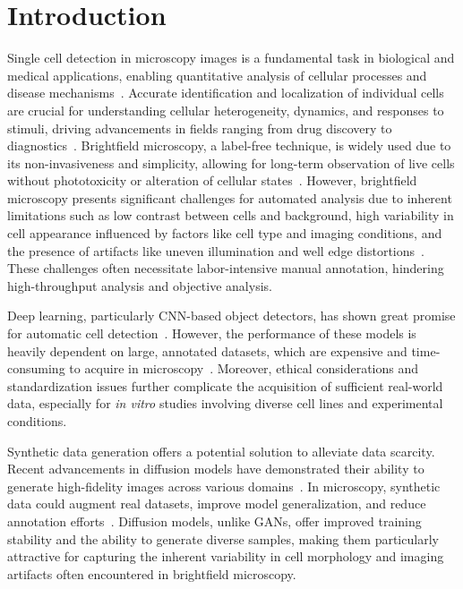 \section{Introduction}
\label{sec:introduction}
Single cell detection in microscopy images is a fundamental task in biological and medical applications, enabling quantitative analysis of cellular processes and disease mechanisms~\cite{meijering_cell_2012}.
Accurate identification and localization of individual cells are crucial for understanding cellular heterogeneity, dynamics, and responses to stimuli, driving advancements in fields ranging from drug discovery to diagnostics~\cite{f_mualla_automatic_2016,e_d_ferreira_classification_2024}.
Brightfield microscopy, a label-free technique, is widely used due to its non-invasiveness and simplicity, allowing for long-term observation of live cells without phototoxicity or alteration of cellular states~\cite{jyrki_selinummi_bright_2009,huixia_ren_cellbow_2020}.
However, brightfield microscopy presents significant challenges for automated analysis due to inherent limitations such as low contrast between cells and background, high variability in cell appearance influenced by factors like cell type and imaging conditions, and the presence of artifacts like uneven illumination and well edge distortions~\cite{jyrki_selinummi_bright_2009,f_mualla_automatic_2016}.
These challenges often necessitate labor-intensive manual annotation, hindering high-throughput analysis and objective analysis.

Deep learning, particularly CNN-based object detectors, has shown great promise for automatic cell detection~\cite{erick_moen_deep_2019,thorsten_falk_u-net_2019}.
However, the performance of these models is heavily dependent on large, annotated datasets, which are expensive and time-consuming to acquire in microscopy~\cite{ronneberger_u-net_2015}.
Moreover, ethical considerations and standardization issues further complicate the acquisition of sufficient real-world data, especially for \textit{in vitro} studies involving diverse cell lines and experimental conditions.

Synthetic data generation offers a potential solution to alleviate data scarcity.
Recent advancements in diffusion models have demonstrated their ability to generate high-fidelity images across various domains~\cite{ho_denoising_2020,song_denoising_2020}.
In microscopy, synthetic data could augment real datasets, improve model generalization, and reduce annotation efforts~\cite{rajaram_simucell_2012,trampert_deep_2021,lehmussola_synthetic_2008}.
Diffusion models, unlike GANs, offer improved training stability and the ability to generate diverse samples, making them particularly attractive for capturing the inherent variability in cell morphology and imaging artifacts often encountered in brightfield microscopy.

